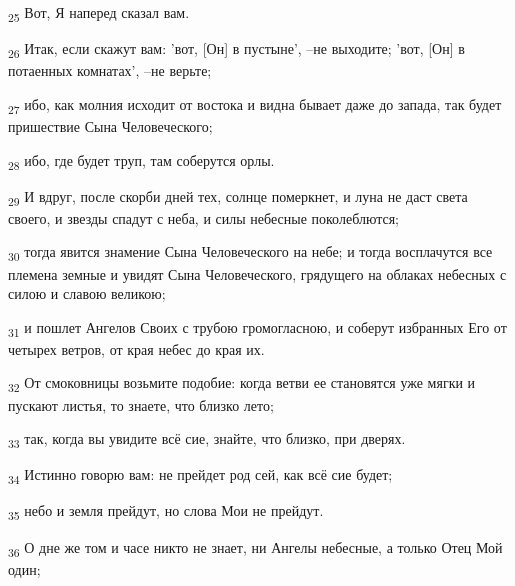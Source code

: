 \begin{tcolorbox}
\textsubscript{25} Вот, Я наперед сказал вам.
\end{tcolorbox}
\begin{tcolorbox}
\textsubscript{26} Итак, если скажут вам: 'вот, [Он] в пустыне', --не выходите; 'вот, [Он] в потаенных комнатах', --не верьте;
\end{tcolorbox}
\begin{tcolorbox}
\textsubscript{27} ибо, как молния исходит от востока и видна бывает даже до запада, так будет пришествие Сына Человеческого;
\end{tcolorbox}
\begin{tcolorbox}
\textsubscript{28} ибо, где будет труп, там соберутся орлы.
\end{tcolorbox}
\begin{tcolorbox}
\textsubscript{29} И вдруг, после скорби дней тех, солнце померкнет, и луна не даст света своего, и звезды спадут с неба, и силы небесные поколеблются;
\end{tcolorbox}
\begin{tcolorbox}
\textsubscript{30} тогда явится знамение Сына Человеческого на небе; и тогда восплачутся все племена земные и увидят Сына Человеческого, грядущего на облаках небесных с силою и славою великою;
\end{tcolorbox}
\begin{tcolorbox}
\textsubscript{31} и пошлет Ангелов Своих с трубою громогласною, и соберут избранных Его от четырех ветров, от края небес до края их.
\end{tcolorbox}
\begin{tcolorbox}
\textsubscript{32} От смоковницы возьмите подобие: когда ветви ее становятся уже мягки и пускают листья, то знаете, что близко лето;
\end{tcolorbox}
\begin{tcolorbox}
\textsubscript{33} так, когда вы увидите всё сие, знайте, что близко, при дверях.
\end{tcolorbox}
\begin{tcolorbox}
\textsubscript{34} Истинно говорю вам: не прейдет род сей, как всё сие будет;
\end{tcolorbox}
\begin{tcolorbox}
\textsubscript{35} небо и земля прейдут, но слова Мои не прейдут.
\end{tcolorbox}
\begin{tcolorbox}
\textsubscript{36} О дне же том и часе никто не знает, ни Ангелы небесные, а только Отец Мой один;
\end{tcolorbox}

